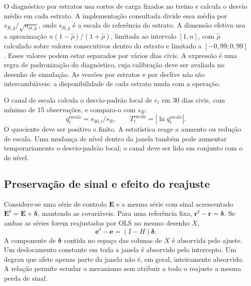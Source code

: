 O diagnóstico por estratos usa cortes de carga fixados no treino e calcula o desvio médio em cada estrato. A implementação consultada divide essa média por $s_{R,g}/\sqrt{n_{\mathrm{ef},g}}$, onde $s_{R,g}$ é a escala de referência do estrato. A dimensão efetiva usa a aproximação $n(1-\widehat\rho)/(1+\widehat\rho)$, limitada ao intervalo $[1,n]$, com $\widehat\rho$ calculado sobre valores consecutivos dentro do estrato e limitado a $[-0{,}99;0{,}99]$. Esses valores podem estar separados por vários dias civis. A expressão é uma regra de padronização do diagnóstico, cuja calibração deve ser avaliada no desenho de simulação. As versões por estratos e por declive não são intercambiáveis: a disponibilidade de cada estrato muda com a operação.

O canal de escala calcula o desvio-padrão local de $r_t$ em 30 dias civis, com mínimo de 15 observações, e compara-o com $s_R$:
\begin{equation}
q_t^{\mathrm{escala}}=s_{30,t}/s_R,
\qquad T_t^{\mathrm{escala}}=|\ln q_t^{\mathrm{escala}}|.
\label{eq:mat-monitor-escala}
\end{equation}
O quociente deve ser positivo e finito. A estatística reage a aumento ou redução de escala. Uma mudança de nível dentro da janela também pode aumentar temporariamente o desvio-padrão local; o canal deve ser lido em conjunto com o de nível.

\subsection{Preservação de sinal e efeito do reajuste}
\label{sec:mat-preservacao}
Considere-se uma série de controlo $\boldsymbol E$ e a mesma série com sinal acrescentado $\boldsymbol E^\delta=\boldsymbol E+\boldsymbol\delta$, mantendo as covariáveis. Para uma referência fixa, $\boldsymbol r^\delta-\boldsymbol r=\boldsymbol\delta$. Se ambas as séries forem reajustadas por OLS no mesmo desenho $X$,
\begin{equation}
\boldsymbol e^\delta-\boldsymbol e=(I-H)\boldsymbol\delta.
\label{eq:mat-projecao-sinal}
\end{equation}
A componente de $\boldsymbol\delta$ contida no espaço das colunas de $X$ é absorvida pelo ajuste. Um deslocamento constante em toda a janela é absorvido pelo intercepto. Um degrau que afete apenas parte da janela não é, em geral, inteiramente absorvido. A relação permite estudar o mecanismo sem atribuir a todo o reajuste a mesma perda de sinal.


